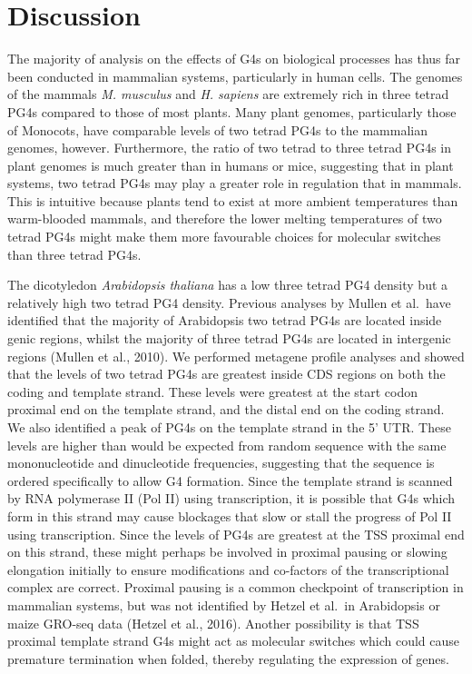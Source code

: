 \documentclass[12pt,a4paper,]{report}
\begin{document}
\newpage

\hypertarget{discussion}{%
\section{Discussion}\label{discussion}}

The majority of analysis on the effects of G4s on biological processes
has thus far been conducted in mammalian systems, particularly in human
cells. The genomes of the mammals \emph{M. musculus} and \emph{H.
sapiens} are extremely rich in three tetrad PG4s compared to those of
most plants. Many plant genomes, particularly those of Monocots, have
comparable levels of two tetrad PG4s to the mammalian genomes, however.
Furthermore, the ratio of two tetrad to three tetrad PG4s in plant
genomes is much greater than in humans or mice, suggesting that in plant
systems, two tetrad PG4s may play a greater role in regulation that in
mammals. This is intuitive because plants tend to exist at more ambient
temperatures than warm-blooded mammals, and therefore the lower melting
temperatures of two tetrad PG4s might make them more favourable choices
for molecular switches than three tetrad PG4s.

The dicotyledon \emph{Arabidopsis thaliana} has a low three tetrad PG4
density but a relatively high two tetrad PG4 density. Previous analyses
by Mullen et al.~have identified that the majority of Arabidopsis two
tetrad PG4s are located inside genic regions, whilst the majority of
three tetrad PG4s are located in intergenic regions (Mullen et al.,
2010). We performed metagene profile analyses and showed that the levels
of two tetrad PG4s are greatest inside CDS regions on both the coding
and template strand. These levels were greatest at the start codon
proximal end on the template strand, and the distal end on the coding
strand. We also identified a peak of PG4s on the template strand in the
5' UTR. These levels are higher than would be expected from random
sequence with the same mononucleotide and dinucleotide frequencies,
suggesting that the sequence is ordered specifically to allow G4
formation. Since the template strand is scanned by RNA polymerase II
(Pol II) using transcription, it is possible that G4s which form in this
strand may cause blockages that slow or stall the progress of Pol II
using transcription. Since the levels of PG4s are greatest at the TSS
proximal end on this strand, these might perhaps be involved in proximal
pausing or slowing elongation initially to ensure modifications and
co-factors of the transcriptional complex are correct. Proximal pausing
is a common checkpoint of transcription in mammalian systems, but was
not identified by Hetzel et al.~in Arabidopsis or maize GRO-seq data
(Hetzel et al., 2016). Another possibility is that TSS proximal template
strand G4s might act as molecular switches which could cause premature
termination when folded, thereby regulating the expression of genes.
\end{document}
